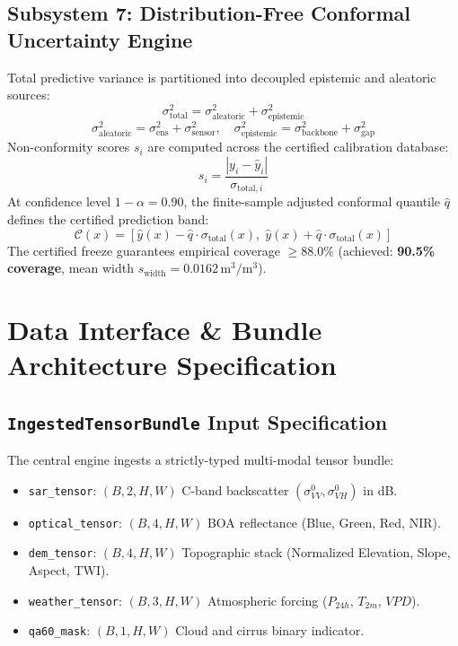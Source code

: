 \documentclass[11pt,a4paper]{article}
\theoremstyle{definition}
\theoremstyle{remark}
\begin{document}
\subsection{Subsystem 7: Distribution-Free Conformal Uncertainty Engine}
Total predictive variance is partitioned into decoupled epistemic and aleatoric sources:
\begin{equation}
    \sigma_{\text{total}}^2 = \sigma_{\text{aleatoric}}^2 + \sigma_{\text{epistemic}}^2
\end{equation}
\begin{equation}
    \sigma_{\text{aleatoric}}^2 = \sigma_{\text{ens}}^2 + \sigma_{\text{sensor}}^2, \quad \sigma_{\text{epistemic}}^2 = \sigma_{\text{backbone}}^2 + \sigma_{\text{gap}}^2
\end{equation}
Non-conformity scores $s_i$ are computed across the certified calibration database:
\begin{equation}
    s_i = \frac{|y_i - \hat{y}_i|}{\sigma_{\text{total}, i}}
\end{equation}
At confidence level $1 - \alpha = 0.90$, the finite-sample adjusted conformal quantile $\hat{q}$ defines the certified prediction band:
\begin{equation}
    \mathcal{C}(x) = \left[\hat{y}(x) - \hat{q} \cdot \sigma_{\text{total}}(x), \; \hat{y}(x) + \hat{q} \cdot \sigma_{\text{total}}(x)\right]
\end{equation}
The certified freeze guarantees empirical coverage $\ge 88.0\%$ (achieved: \textbf{90.5\% coverage}, mean width $s_{\text{width}} = 0.0162\,\text{m}^3/\text{m}^3$).

\section{Data Interface \& Bundle Architecture Specification}

\subsection{\texttt{IngestedTensorBundle} Input Specification}
The central engine ingests a strictly-typed multi-modal tensor bundle:
\begin{itemize}
    \item \texttt{sar\_tensor}: $(B, 2, H, W)$ C-band backscatter $(\sigma^0_{VV}, \sigma^0_{VH})$ in dB.
    \item \texttt{optical\_tensor}: $(B, 4, H, W)$ BOA reflectance (Blue, Green, Red, NIR).
    \item \texttt{dem\_tensor}: $(B, 4, H, W)$ Topographic stack (Normalized Elevation, Slope, Aspect, TWI).
    \item \texttt{weather\_tensor}: $(B, 3, H, W)$ Atmospheric forcing ($P_{24h}$, $T_{2m}$, $VPD$).
    \item \texttt{qa60\_mask}: $(B, 1, H, W)$ Cloud and cirrus binary indicator.
\end{itemize}
\end{document}
